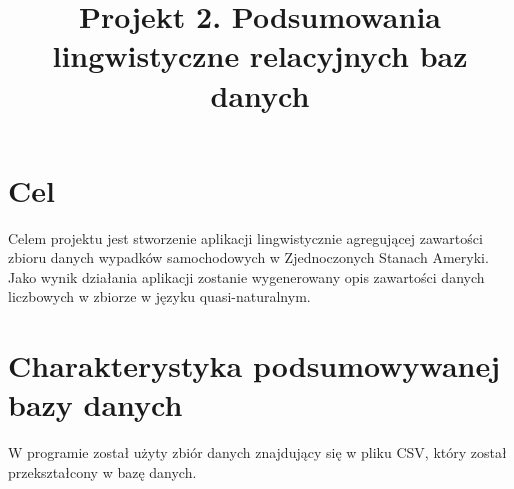 \documentclass{classrep}
\author{
  \studentinfo{Julia Szymańska}{224441} \and
  \studentinfo{Przemysław Zdrzalik}{224466} }
\title{Projekt 2.  Podsumowania lingwistyczne relacyjnych baz danych}
\begin{document}
\maketitle

\section{Cel}
Celem projektu jest stworzenie aplikacji lingwistycznie agregującej zawartości zbioru danych wypadków samochodowych w Zjednoczonych Stanach Ameryki\cite{dane}. Jako wynik działania aplikacji zostanie wygenerowany opis zawartości danych liczbowych w zbiorze w języku quasi-naturalnym.


\section{Charakterystyka podsumowywanej bazy danych}
W programie został użyty zbiór danych\cite{dane} znajdujący się w pliku CSV, który został przekształcony w bazę danych. 
\end{document}
